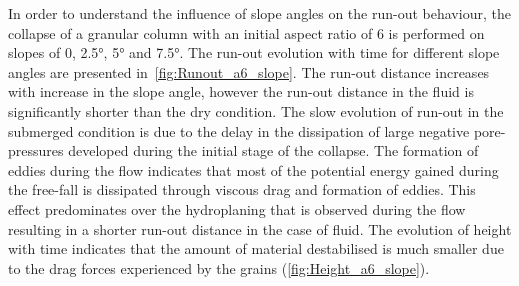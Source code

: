 In order to understand the influence of slope angles on the run-out behaviour, 
the collapse of a granular column with an initial aspect ratio of 6 is 
performed on slopes of 0, 2.5\si{\degree}, 5\si{\degree} and 7.5\si{\degree}. 
The run-out evolution with time for different slope angles are presented 
in~\cref{fig:Runout_a6_slope}. The run-out distance increases with increase 
in the slope angle, however the run-out distance in the fluid is significantly 
shorter than the dry condition. The slow evolution of run-out in the submerged 
condition is due to the delay in the dissipation of large negative 
pore-pressures developed during the initial stage of the collapse. The 
formation of eddies during the flow indicates that most of the potential energy 
gained during the free-fall is dissipated through viscous drag and formation of 
eddies. This effect predominates over the hydroplaning that is observed during 
the flow resulting in a shorter run-out distance in the case of fluid. The 
evolution of height with time indicates that the amount of material 
destabilised is much smaller due to the drag forces experienced by the grains 
(\cref{fig:Height_a6_slope}).

